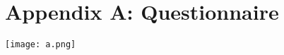 \chapter*{Appendix A: Questionnaire}
\label{A}
\begin{center}
\texttt{[image: a.png]}
\end{center}

